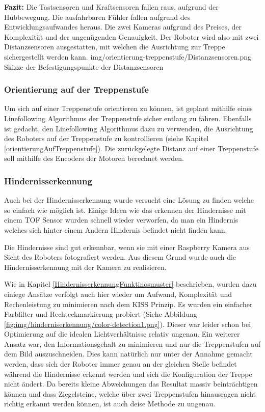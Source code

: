 \textbf{Fazit:} Die Tastsensoren und Kraftsensoren fallen raus, aufgrund der Hubbewegung. Die ausfahrbaren Fühler fallen aufgrund des Entwicklungsaufwandes heraus. Die zwei Kameras aufgrund des Preises, der Komplexität und der ungenügenden Genauigkeit. Der Roboter wird also mit zwei Distanzsensoren ausgestatten, mit welchen die Ausrichtung zur Treppe sichergestellt werden kann.
\image
   {img/orientierung-treppenstufe/Distanzsensoren.png}
   {Skizze der Befestigungspunkte der Distanzsensoren}


\subsubsection{Orientierung auf der Treppenstufe}
\label{orientierung-auf-der-treppenstufe}
Um sich auf einer Treppenstufe orientieren zu können, ist geplant mithilfe eines Linefollowing Algorithmus der Treppenstufe sicher entlang zu fahren. Ebenfalls ist gedacht, den Linefollowing Algorithmus dazu zu verwenden, die Ausrichtung des Roboters auf der Treppenstufe zu kontrollieren (siehe Kapitel \ref{orientierungAufTreppenstufe}).
Die zurückgelegte Distanz auf einer Treppenstufe soll mithilfe des Encoders der Motoren berechnet werden.

\subsubsection{Hindernisserkennung}
\label{hindernisserkennung}

Auch bei der Hindernisserkennung wurde versucht eine Lösung zu finden welche so einfach wie möglich ist.
Einige Ideen wie das erkennen der Hindernisse mit einem \acrshort{TOF} Sensor wurden schnell wieder verworfen,
da man ein Hindernis welches sich hinter einem Andern Hindernis befindet nicht finden kann.

Die Hindernisse sind gut erkennbar, wenn sie mit einer Raspberry Kamera aus Sicht des Roboters 
fotografiert werden. Aus diesem Grund wurde
auch die Hindernisserkennung mit der Kamera zu realisieren.

Wie in Kapitel \ref{HindernisserkennungFunktinosmuster} beschrieben, wurden dazu einiege Ansätze verfolgt
auch hier wieder um Aufwand, Komplexität und Rechenleistung zu minimieren nach dem KISS Prinzip.
Es wurden ein einfacher Farbfilter und Rechteckmarkierung probiert (Siehe Abbildung \ref{fig:img/hinderniserkennung/color-detection1.png}).
Dieser war leider schon bei Optimierung auf die idealen Lichtverhältnisse relativ ungenau.
Ein weiterer Ansatz war, den Informationsgehalt zu minimieren und nur die Treppenstufen auf dem Bild auszuschneiden.
Dies kann natürlich nur unter der Annahme gemacht werden, dass sich der Roboter immer genau an der gleichen Stelle
befindet während die Hindernisse erkennt werden und sich die Konfiguration der Treppe nicht ändert.
Da bereits kleine Abweichungen das Resultat massiv beinträchtigen können und dass Ziegelsteine, welche
über zwei Treppenstufen hinausragen nicht richtig erkannt werden können, ist auch deise Methode zu ungenau.

